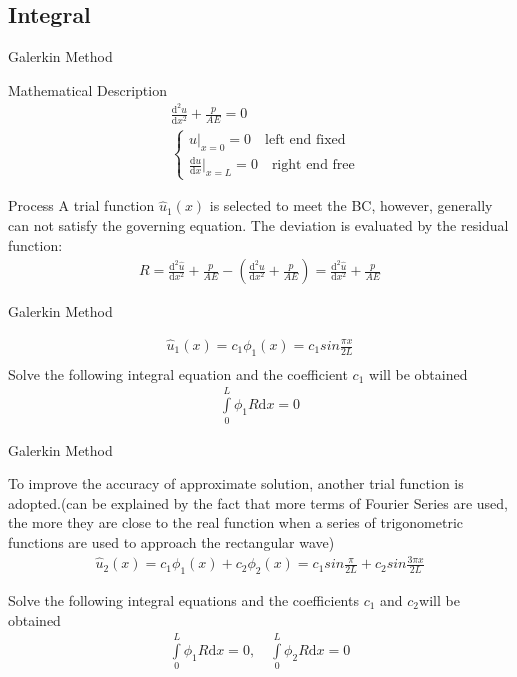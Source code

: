 \documentclass[11pt]{beamer}
\begin{document}
\subsection{Integral}
\begin{frame}{Galerkin Method}
\begin{block}{Mathematical Description}
\begin{align*}
&\frac{\mathrm{d}^2u}{\mathrm{d}x^2}+\frac{p}{AE}=0\\
&{\begin{cases}
u|_{x=0}=0 \quad\text{left end fixed}\\
\frac{\mathrm{d}u}{\mathrm{d}x}|_{x=L}=0\quad\text{right end free}
\end{cases}}
\end{align*}
\end{block}

\begin{block}{Process}
A trial function $\hat{u}_1(x)$ is selected to meet the BC, however, generally can not satisfy the governing equation. The deviation is evaluated by the residual function:
\begin{align*}
R=\frac{\mathrm{d}^2\hat{u}}{\mathrm{d}x^2}+\frac{p}{AE}-(\frac{\mathrm{d}^2u}{\mathrm{d}x^2}+\frac{p}{AE})=\frac{\mathrm{d}^2\hat{u}}{\mathrm{d}x^2}+\frac{p}{AE}
\end{align*}
\end{block}
\end{frame}

\begin{frame}{Galerkin Method}
\begin{example}
\begin{align*}
\hat{u}_1(x)=c_1\phi_1(x)=c_1sin\frac{\pi x}{2L}\\
\end{align*}
Solve the following integral equation and the coefficient $c_1$ will be obtained
\begin{align*}
\int\limits_{0}^{L}\phi_1R\mathrm{d}x=0
\end{align*}
\end{example}
\end{frame}


\begin{frame}{Galerkin Method}
\begin{example}
To improve the accuracy of approximate solution, another trial function is adopted.(can be explained by the fact that more terms of Fourier Series are used, the more they are close to the real function when a series of trigonometric functions are used to approach the rectangular wave)
\begin{align*}
\hat{u}_2(x)=c_1\phi_1(x)+c_2\phi_2(x)=c_1sin\frac{\pi}{2L}+c_2sin\frac{3\pi x}{2L}
\end{align*}

Solve the following integral equations and the coefficients $c_1$ and $c_2$will be obtained
\begin{align*}
\int\limits_{0}^{L}\phi_1R\mathrm{d}x=0,\quad\int\limits_{0}^{L}\phi_2R\mathrm{d}x=0
\end{align*}
\end{example}
\end{frame}
\end{document}
